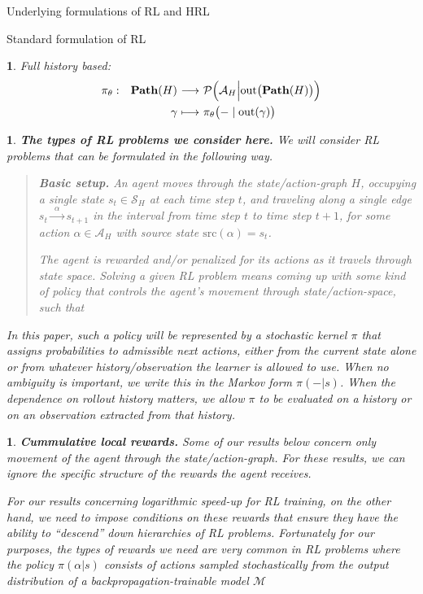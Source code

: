 \documentclass[11pt]{article}
\newtheorem{ermark}[subsubsection]{}
\begin{document}
\begin{section}{Underlying formulations of RL and HRL}
\begin{subsection}{Standard formulation of RL}
\begin{ermark}
Full history based:
$$
\begin{array}{rrcl}
\pi_{\theta}:
&\bold{Path}(H)
&
\!\!\!\!\longrightarrow\!\!\!\!
&\mathcal{P}\Big(\mathcal{A}_{H}\Big|\text{out}\big(\bold{Path}(H)\big)\Big) \\[7pt]
&
\gamma
&
\!\!\!\!\longmapsto\!\!\!\!
& \pi_{\theta}\big(-\mid \text{out}(\gamma)\big)
\end{array}
$$
\end{ermark}

\begin{ermark}
{\bf The types of RL problems we consider here.}
\normalfont
We will consider RL problems that can be formulated in the following way.

\begin{quote}
{\bf Basic setup.}
An agent moves through the state/action-graph $H$, occupying a single state $s_{t}\in\mathcal{S}_{H}$ at each time step $t$, and traveling along a single edge 
$
s_{t}\xrightarrow{\ \ \alpha\ \ }s_{t+1}
$
in the interval from time step $t$ to time step $t+1$, for some action $\alpha\in\mathcal{A}_{H}$ with source state $\text{src}(\alpha)=s_{t}$.

The agent is rewarded and/or penalized for its actions as it travels through state space. {\em Solving} a given RL problem means coming up with some kind of policy that controls the agent's movement through state/action-space, such that 
\end{quote}
In this paper, such a policy will be represented by a stochastic kernel $\pi$ that assigns probabilities to admissible next actions, either from the current state alone or from whatever history/observation the learner is allowed to use. When no ambiguity is important, we write this in the Markov form $\pi(-|s)$. When the dependence on rollout history matters, we allow $\pi$ to be evaluated on a history or on an observation extracted from that history.
\end{ermark}
 
 \begin{ermark}
{\bf Cummulative local rewards.}
\normalfont
Some of our results below concern only movement of the agent through the state/action-graph. For these results, we can ignore the specific structure of the rewards the agent receives. 

For our results concerning logarithmic speed-up for RL training, on the other hand, we need to impose conditions on these rewards that ensure they have the ability to ``descend'' down hierarchies of RL problems. Fortunately for our purposes, the types of rewards we need are very common in RL problems where the policy $\pi(\alpha|s)$ consists of actions sampled stochastically from the output distribution of a backpropagation-trainable model $\mathcal{M}$
 \end{ermark}


\end{subsection}
\end{section}
\end{document}
